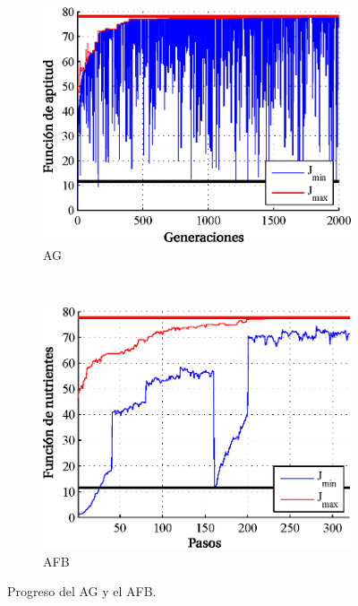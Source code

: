 \begin{figure}[t]
    \centering
    \begin{subfigure}[b]{0.49\textwidth}
    \centering
        \includegraphics[scale=0.65]{../img/Optimizacion_del_Diseno/gaevolution.eps}
        \caption{AG}
        \label{fig:gaevolution}
    \end{subfigure}
    ~ %
    \begin{subfigure}[b]{0.49\textwidth}
    \centering
        \includegraphics[scale=0.65]{../img/Optimizacion_del_Diseno/bfevolution.eps}
        \caption{AFB}
        \label{fig:bfevolution}
    \end{subfigure}
    \caption{Progreso del AG y el AFB.}\label{fig:gabfevolution}
\end{figure}

